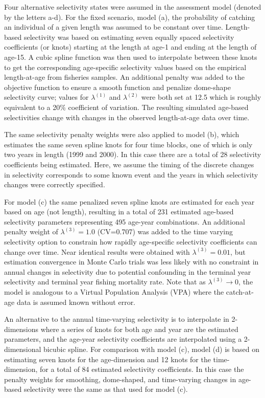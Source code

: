 Four alternative selectivity states were assumed in the assessment model (denoted by the letters a-d).  For the fixed scenario, model (a), the probability of catching an individual of a given length was assumed to be constant over time.  Length-based selectivity was based on estimating seven equally spaced selectivity coefficients (or knots) starting at the length at age-1 and ending at the length of age-15.  A cubic spline function was then used to interpolate between these knots to get the corresponding age-specific selectivity values based on the empirical length-at-age from fisheries samples.  An additional penalty was added to the objective function to ensure a smooth function and penalize  dome-shape selectivity curve; values for $\lambda^{(1)}$ and $\lambda^{(2)}$ were both set at 12.5 which is roughly equivalent to a 20\% coefficient of variation.  The resulting simulated age-based selectivities change with changes in the observed length-at-age data over time.

The same selectivity penalty weights were also applied to model (b), which estimates the same seven spline knots for four time blocks, one of which is only two years in length (1999 and 2000).  In this case there are a total of 28 selectivity coefficients being estimated.  Here, we assume the timing of the discrete changes in selectivity corresponds to some known event and the years in which selectivity changes were correctly specified.  

For model (c) the same penalized seven spline knots are estimated for each year based on age (not length), resulting in a total of 231 estimated age-based selectivity parameters representing 495 age-year combinations.  An additional penalty weight of $\lambda^{(3)}=1.0$ (CV=0.707) was added to the time varying selectivity option to constrain how rapidly age-specific selectivity coefficients can change over time.  Near identical results were  obtained with $\lambda^{(3)}=0.01$, but estimation convergence in Monte Carlo trials was less likely with no constraint in annual changes in selectivity due to potential confounding in the terminal year selectivity and terminal year fishing mortality rate.  Note that as $\lambda^{(3)}\rightarrow 0$, the model is analogous to a Virtual Population Analysis (VPA) where the catch-at-age data is assumed known without error.

An alternative to the annual time-varying selectivity is to interpolate in 2-dimensions where a series of knots for both age and year are the estimated parameters, and the age-year selectivity coefficients are interpolated using a 2-dimensional bicubic spline.  For comparison with model (c), model (d) is based on estimating seven knots for the age-dimension and 12 knots for the time-dimension, for a total of 84 estimated selectivity coefficients.  In this case the penalty weights for smoothing, dome-shaped, and time-varying changes in age-based selectivity were the same as that used for model (c).  

